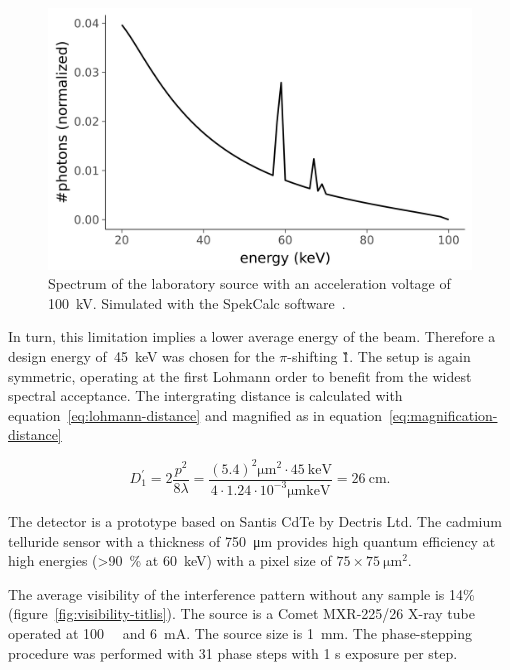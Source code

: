 \begin{figure}[htb]
    \centering
    \includegraphics[width=\textwidth]{gfx/spectrum-visibility/spectrum-100kV.png}
    \caption{Spectrum of the laboratory source with an acceleration voltage of
        \SI{100}{\kilo\volt}. Simulated with the SpekCalc
        software~\cite{spekcalc}.}
    \label{fig:spectrum-100kV}
\end{figure}

In turn, this limitation implies a lower average energy of the beam.
Therefore a design energy of~\SI{45}{\kilo\eV} was chosen for the
$\pi$-shifting \G1. The setup is again symmetric, operating at the first
Lohmann order to benefit from the widest spectral acceptance. The
intergrating distance is calculated with
equation~\eqref{eq:lohmann-distance} and magnified as in
equation~\eqref{eq:magnification-distance}

\begin{equation}
    D_1^\prime = 2\frac{p^2}{8\lambda} =
    \frac{(5.4)^2\si{\micro\meter\squared} \cdot \SI{45}{\kilo\eV}}{4
        \cdot 1.24 \cdot 10^{-3}\si{\micro\meter\kilo\eV}} =
        \SI{26}{\centi\meter}.
    \label{eq:intergrating-distance}
\end{equation}

The detector is a prototype based on Santis CdTe by Dectris Ltd. The cadmium
telluride sensor with a thickness of \SI{750}{\micro\meter} provides high
quantum efficiency at high energies (>\SI{90}{\percent} at
\SI{60}{\kilo\eV}) with a pixel size of
$75\times\SI{75}{\micro\meter\squared}$. 

The average visibility of the interference pattern without any
sample is 14\% (figure~\ref{fig:visibility-titlis}). The source is a Comet
MXR-225/26 X-ray tube operated at \SI{100}{\kilo\voltpeak} and
\SI{6}{\milli\ampere}. The source size is \SI{1}{\milli\meter}.
The phase-stepping procedure was performed with 31 phase steps with 1 s
exposure per step.

